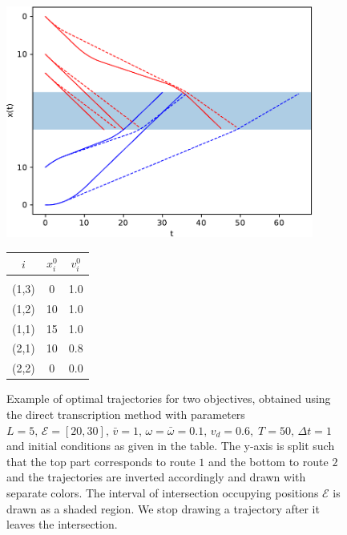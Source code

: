 \documentclass[a4paper]{report}
\theoremstyle{definition}
\theoremstyle{plain}
\begin{document}
\begin{figure}
  \centering
  \begin{minipage}{0.76\textwidth}
  \includegraphics[width=0.9\textwidth]{figures/single/trajectories_general.pdf}%
  \end{minipage}
  \begin{minipage}{0.23\textwidth}
  \vspace*{-1em}
  \begin{tabular}{ c c c }
    $i$ & $x_{i}^{0}$ & $v_{i}^{0}$ \\[0.2em]
    \hline\\[-1em]
    {\color{red}(1,3)} &  0 & 1.0 \\
    {\color{red}(1,2)} & 10 & 1.0 \\
    {\color{red}(1,1)} & 15 & 1.0 \\
    {\color{blue}(2,1)} & 10 & 0.8 \\
    {\color{blue}(2,2)} &  0 & 0.0
  \end{tabular}
  \end{minipage}
  \caption{Example of optimal trajectories for two objectives, obtained using
    the direct transcription method with parameters
    $L = 5, \, \mathcal{E} = [20, 30], \, \bar{v} = 1, \, \omega = \bar{\omega} = 0.1, \, v_{d} = 0.6, \; T=50, \, \Delta t = 1$
    and initial conditions as given in the table. The y-axis is split such that
    the top part corresponds to route $1$ and the bottom to route $2$ and the
    trajectories are inverted accordingly and drawn with separate colors. The
    interval of intersection occupying positions $\mathcal{E}$ is drawn as a
    shaded region. We stop drawing a trajectory after it leaves the
    intersection.}%
  \label{fig:direct_transcription_example}
\end{figure}
\end{document}
